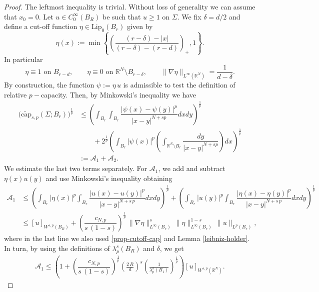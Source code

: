 \documentclass{amsart}
\theoremstyle{definition}
\numberwithin{equation}{section}
\begin{document}
\begin{proof}
	The leftmost inequality is trivial. Without loss of generality  we can assume  that $x_0 = 0$. Let $u \in C^\infty_0(B_R)$ be such that $u \geq 1$ on $\Sigma$. We fix $\delta = d/2$ and define a cut-off function $\eta \in \mathrm{Lip}_0(B_{r})$ given by \[
	\eta(x):=\min\left\{\left(\dfrac{(r- \delta) - |x|}{(r-\delta) - (r-d)}\right)_{+}, 1\right\}.
	\]
	In particular 
	\begin{equation} \label{prop-cutoff-cap}
		\eta \equiv 1 \mbox{ on } B_{r-d}, \qquad \eta \equiv 0 \mbox{ on } \mathbb{R}^N \setminus B_{r-\delta}, \qquad \|\nabla \eta\|_{L^\infty(\mathbb{R}^N)} = \dfrac{1}{d -\delta}.
	\end{equation}
	By construction, the function $\psi := \eta\,u$ is admissible to test the definition of relative $p-$capacity. Then, by Minkowski's inequality we have 
	\begin{align*} \nonumber
		\Big(\widetilde{\mathrm{cap}}_{s,p}(\Sigma; B_r)\Big)^{\frac{1}{p}} &\leq \left(\int_{B_r}\int_{B_r} \dfrac{|\psi(x) - \psi(y)|^p}{|x-y|^{N+sp}}dxdy\right)^{\frac{1}{p}} \\&\qquad + 2^{\frac{1}{p}}\left(\int_{B_r} |\psi(x)|^p\left(\int_{\mathbb{R}^N \setminus B_r} \dfrac{dy}{|x-y|^{N+sp}}\right) dx\right)^{\frac{1}{p}} \\
		&:= \mathcal{A}_1 + \mathcal{A}_2.
	\end{align*} 
 We estimate the last two terms separately. For $\mathcal{A}_1$, we add and subtract $\eta(x)u(y)$ and use Minkowski's inequality obtaining
	\begin{align*}
		\mathcal{A}_1 &\leq \left(\int_{B_r} |\eta(x)|^p \int_{B_r}\dfrac{|u(x) - u(y)|^p}{|x-y|^{N+s\,p}} dxdy\right)^{\frac{1}{p}} + \left(\int_{B_r} |u(y)|^p \int_{B_r} \dfrac{|\eta(x) - \eta(y)|^p}{|x-y|^{N+s\,p}} dx dy\right)^{\frac{1}{p}} \\ &\leq
		[u]_{W^{s,p}(B_R)} + \left(\dfrac{c_{N,p}}{s\,(1-s)}\right)^{\frac{1}{p}}\,\|\nabla \eta\|^s_{L^\infty(B_r)}\,\|\eta\|^{1-s}_{L^\infty(B_r)}\,\|u\|_{L^p(B_r)},
	\end{align*}
	where in the last line we also used \eqref{prop-cutoff-cap} and Lemma \ref{leibniz-holder}. In turn, by using the definitions of $\lambda_{p}^s(B_R)$ and $\delta$, we get \begin{align*} 
		\mathcal{A}_1 \le \left(1 + \left(\dfrac{c_{N,p}}{s\,(1-s)}\right)^{\frac{1}{p}} \left(\frac{2\,R}{d}\right)^s \left(\frac{1}{\lambda^s_{p}(B_1)}\right)^{\frac{1}{p}}\right)[u]_{W^{s,p}(\mathbb{R}^N)}. 
	\end{align*}

\end{proof}
\end{document}
